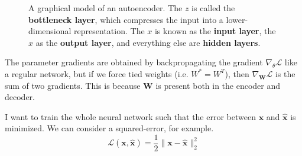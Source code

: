 \documentclass{article}
\begin{document}
\begin{definition}[Autoencoder]
\begin{figure}[H]
      \caption{A graphical model of an autoencoder. The $z$ is called the \textbf{bottleneck layer}, which compresses the input into a lower-dimensional representation. The $x$ is known as the \textbf{input layer}, the $\hat{x}$ as the \textbf{output layer}, and everything else are \textbf{hidden layers}.} 
      \label{fig:autoencoder}
    \end{figure}
  \end{definition}


  The parameter gradients are obtained by backpropagating the gradient $\nabla_{\theta} \mathcal{L}$ like a regular network, but if we force tied weights (i.e. $W^\ast = W^T$), then $\nabla_{\mathbf{W}} \mathcal{L}$ is the sum of two gradients. This is because $\mathbf{W}$ is present both in the encoder and decoder. 

  I want to train the whole neural network such that the error between $\mathbf{x}$ and $\hat{\mathbf{x}}$ is minimized. We can consider a squared-error, for example. 
  \begin{equation}
    \mathcal{L}(\mathbf{x}, \hat{\mathbf{x}}) = \frac{1}{2} \|\mathbf{x} - \hat{\mathbf{x}}\|_2^2
  \end{equation}
\end{document}
